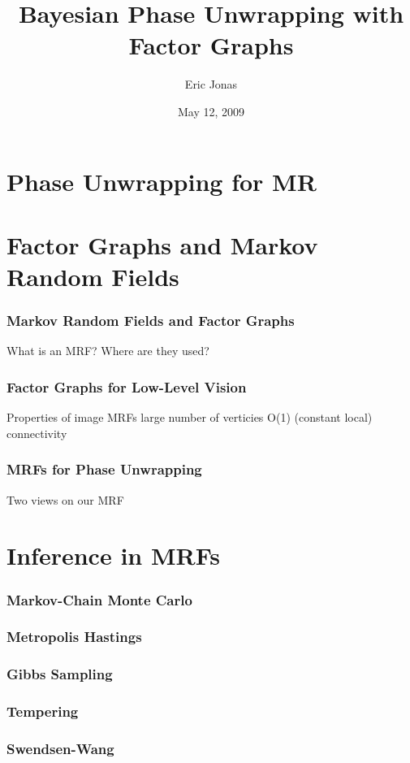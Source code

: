 \documentclass{beamer}
\title{Bayesian Phase Unwrapping with Factor Graphs}
\author{Eric Jonas}
\date{May 12, 2009}
\institute[6.556]{MIT Department of Brain and Cognitive Sciences}
\begin{document}
\begin{frame}
\maketitle
\end{frame}

\section{Phase Unwrapping for MR}


\section{Factor Graphs and Markov Random Fields}
\begin{frame}
\frametitle{Markov Random Fields and Factor Graphs}
What is an MRF? Where are they used? 
\end{frame}

\begin{frame} 
\frametitle{Factor Graphs for Low-Level Vision}
Properties of image MRFs
large number of verticies
O(1) (constant local) connectivity
\end{frame}

\begin{frame} 
\frametitle{MRFs for Phase Unwrapping}
Two views on our MRF
\end{frame}

\section{Inference in MRFs}

\begin{frame}
  \frametitle{Markov-Chain Monte Carlo}
\end{frame}

\begin{frame}
  \frametitle{Metropolis Hastings}
\end{frame}

\begin{frame}
  \frametitle{Gibbs Sampling}
\end{frame}

\begin{frame}
  \frametitle{Tempering} 
\end{frame}

\begin{frame}
  \frametitle{Swendsen-Wang}
\end{frame}
\end{document}
